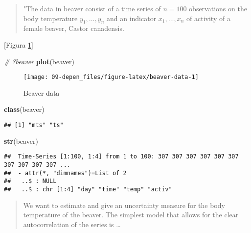 \documentclass[
]{book}
\newenvironment{Shaded}{\begin{snugshade}}{\end{snugshade}}
\newcommand{\CommentTok}[1]{\textcolor[rgb]{0.56,0.35,0.01}{\textit{#1}}}
\newcommand{\KeywordTok}[1]{\textcolor[rgb]{0.13,0.29,0.53}{\textbf{#1}}}
\newcommand{\NormalTok}[1]{#1}
\theoremstyle{break}
\theoremstyle{definition}
\theoremstyle{definition}
\theoremstyle{definition}
\theoremstyle{remark}
\begin{document}
\begin{quote}
"The data in beaver consist of a time series of \(n = 100\)
observations on the body temperature \(y_1, \ldots, y_n\)
and an indicator \(x_1, \ldots, x_n\) of activity of
a female beaver, Castor canadensis.
\end{quote}

{[}Figura \ref{fig:beaver-data}{]}

\begin{Shaded}
\begin{Highlighting}[]
\CommentTok{# ?beaver}
\KeywordTok{plot}\NormalTok{(beaver)}
\end{Highlighting}
\end{Shaded}

\begin{figure}[!htb]

{\centering \texttt{[image: 09-depen\_files/figure-latex/beaver-data-1]} 

}

\caption{Beaver data}\label{fig:beaver-data}
\end{figure}

\begin{Shaded}
\begin{Highlighting}[]
\KeywordTok{class}\NormalTok{(beaver)}
\end{Highlighting}
\end{Shaded}

\begin{verbatim}
## [1] "mts" "ts"
\end{verbatim}

\begin{Shaded}
\begin{Highlighting}[]
\KeywordTok{str}\NormalTok{(beaver) }
\end{Highlighting}
\end{Shaded}

\begin{verbatim}
##  Time-Series [1:100, 1:4] from 1 to 100: 307 307 307 307 307 307 307 307 307 307 ...
##  - attr(*, "dimnames")=List of 2
##   ..$ : NULL
##   ..$ : chr [1:4] "day" "time" "temp" "activ"
\end{verbatim}

\begin{quote}
We want to estimate and give an uncertainty measure
for the body temperature of the beaver.
The simplest model that allows for the clear
autocorrelation of the series is \ldots{}
\end{quote}
\end{document}
